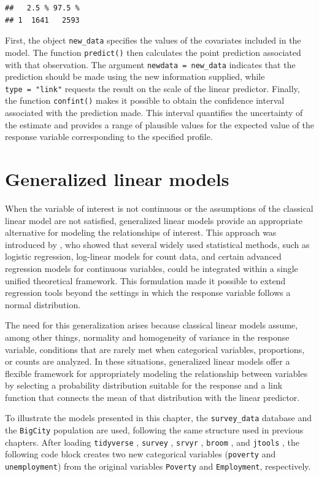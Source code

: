 \documentclass[
  english,
  12pt,
]{book}
\begin{document}
\begin{verbatim}
##   2.5 % 97.5 %
## 1  1641   2593
\end{verbatim}

First, the object \texttt{new\_data} specifies the values of the covariates included in the model. The function \texttt{predict()} then calculates the point prediction associated with that observation. The argument \texttt{newdata\ =\ new\_data} indicates that the prediction should be made using the new information supplied, while \texttt{type\ =\ "link"} requests the result on the scale of the linear predictor. Finally, the function \texttt{confint()} makes it possible to obtain the confidence interval associated with the prediction made. This interval quantifies the uncertainty of the estimate and provides a range of plausible values for the expected value of the response variable corresponding to the specified profile.

\chapter{Generalized linear models}\label{cap6}

When the variable of interest is not continuous or the assumptions of the classical linear model are not satisfied, generalized linear models provide an appropriate alternative for modeling the relationships of interest. This approach was introduced by \citet{nelder1972generalized}, who showed that several widely used statistical methods, such as logistic regression, log-linear models for count data, and certain advanced regression models for continuous variables, could be integrated within a single unified theoretical framework. This formulation made it possible to extend regression tools beyond the settings in which the response variable follows a normal distribution.

The need for this generalization arises because classical linear models assume, among other things, normality and homogeneity of variance in the response variable, conditions that are rarely met when categorical variables, proportions, or counts are analyzed. In these situations, generalized linear models offer a flexible framework for appropriately modeling the relationship between variables by selecting a probability distribution suitable for the response and a link function that connects the mean of that distribution with the linear predictor.

To illustrate the models presented in this chapter, the \texttt{survey\_data} database and the \texttt{BigCity} population are used, following the same structure used in previous chapters. After loading \texttt{tidyverse} \citep{tidyverse2026}, \texttt{survey} \citep{Lumley2024}, \texttt{srvyr} \citep{Freedman2024}, \texttt{broom} \citep{broom2026}, and \texttt{jtools} \citep{jtools2026}, the following code block creates two new categorical variables (\texttt{poverty} and \texttt{unemployment}) from the original variables \texttt{Poverty} and \texttt{Employment}, respectively.
\end{document}
